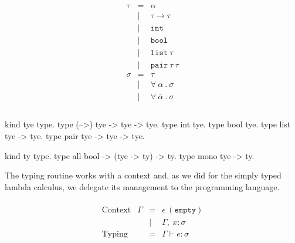 \documentclass[a4paper, 11pt]{book}
\begin{document}
\begin{center}
\begin{minipage}{0.4\textwidth}
$$
\begin{array}{lrl}
  \\
    \tau   &=     & \alpha                    \\
                              &\vert &  \tau \to \tau         \\
                              &\vert &  \mathtt{int}         \\
                              &\vert &  \mathtt{bool}         \\
                              &\vert &  \mathtt{list}\ \tau         \\
                              &\vert &  \mathtt{pair}\ \tau\ \tau         \\
  
     \sigma &=    & \tau                                           \\
                             &\vert& \forall\ \alpha\ .\ \sigma \\
                            &\vert& \forall\ \bar\alpha\ .\ \sigma \\
  \\
\end{array}
$$
\end{minipage}
\begin{minipage}{0.5\textwidth}
\begin{elpicodelj}
kind tye   type.
type (-->) tye -> tye -> tye.  
type int   tye.
type bool  tye.
type list  tye -> tye.
type pair  tye -> tye -> tye.

kind ty     type.
type all    bool -> (tye -> ty) -> ty.
type mono   tye -> ty.
\end{elpicodelj}
\end{minipage}
\end{center}



The typing routine works with a context and, as we did for the simply typed
lambda calculus, we delegate its management to the programming language.

$$
\begin{array}{llrl}
  \\
    \text{Context}     & \Gamma & = & \epsilon\ \mathtt{(empty)}\\
                       &        & \vert& \Gamma,\ x : \sigma\\
    \text{Typing}      &        & = & \Gamma \vdash e : \sigma\\
  \\
  \end{array}
$$
\end{document}
